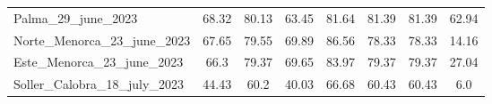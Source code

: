\begin{table}[H]
{\begin{tabular}{lccccccc}
            Palma\_29\_june\_2023                  & 68.32     & 80.13      &
            63.45                                  & 81.64     &
            81.39                                  & 81.39     & 62.94
            \\
            Norte\_Menorca\_23\_june\_2023         & 67.65     & 79.55      &
            69.89                                  & 86.56     &
            78.33                                  & 78.33     & 14.16
            \\
            Este\_Menorca\_23\_june\_2023          & 66.3      & 79.37      &
            69.65                                  & 83.97     &
            79.37                                  & 79.37     & 27.04
            \\
            Soller\_Calobra\_18\_july\_2023        & 44.43     & 60.2       &
            40.03                                  & 66.68     &
            60.43                                  & 60.43     & 6.0
            \\ \bottomrule
        \end{tabular}%
    }
\end{table}

